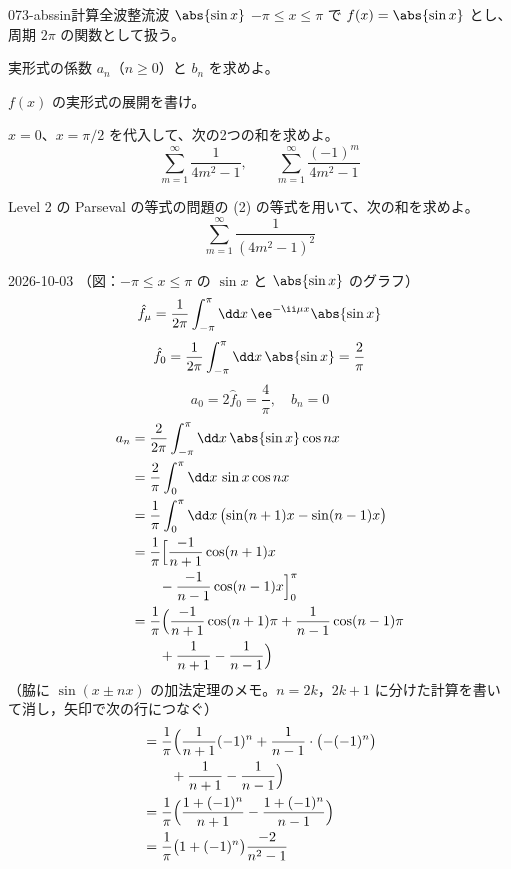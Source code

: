 \documentclass[uplatex,dvipdfmx,a4paper,11pt]{jsarticle}
\begin{document}
\begin{mondai}{073-abssin}{計算}{全波整流波 $\abs{\sin x}$}
$-\pi\le x\le\pi$ で $f(x)=\abs{\sin x}$ とし、周期 $2\pi$ の関数として扱う。
\begin{shoumon}
  \item 実形式の係数 $a_n$（$n\ge0$）と $b_n$ を求めよ。
  \item $f(x)$ の実形式の展開を書け。
  \item $x=0$、$x=\pi/2$ を代入して、次の2つの和を求めよ。
\[
\sum_{m=1}^{\infty}\frac{1}{4m^{2}-1},\qquad\sum_{m=1}^{\infty}\frac{(-1)^{m}}{4m^{2}-1}
\]
  \item Level 2 の Parseval の等式の問題の (2) の等式を用いて、次の和を求めよ。
\[
\sum_{m=1}^{\infty}\frac{1}{(4m^{2}-1)^{2}}
\]
\end{shoumon}
\begin{kotaeutsushi}{2026-10-03}
（図：$-\pi\le x\le\pi$ の $\sin x$ と $\abs{\sin x}$ のグラフ）
\[ \hat{f}_{\mu}=\frac{1}{2\pi}\int_{-\pi}^{\pi}\dd x\,\ee^{-\ii\mu x}\abs{\sin x} \]
\[ \hat{f}_0=\frac{1}{2\pi}\int_{-\pi}^{\pi}\dd x\,\abs{\sin x}=\frac{2}{\pi} \]
\[ a_0=2\hat{f}_0=\frac{4}{\pi},\quad b_n=0 \]
\begin{align*}
  a_n&=\frac{2}{2\pi}\int_{-\pi}^{\pi}\dd x\,\abs{\sin x}\cos nx\\
  &=\frac{2}{\pi}\int_{0}^{\pi}\dd x\,\sin x\cos nx\\
  &=\frac{1}{\pi}\int_{0}^{\pi}\dd x\,\bigl(\sin(n+1)x-\sin(n-1)x\bigr)\\
  &=\frac{1}{\pi}\Bigl[\frac{-1}{n+1}\cos(n+1)x\\
  &\qquad-\frac{-1}{n-1}\cos(n-1)x\Bigr]_{0}^{\pi}\\
  &=\frac{1}{\pi}\Bigl(\frac{-1}{n+1}\cos(n+1)\pi+\frac{1}{n-1}\cos(n-1)\pi\\
  &\qquad+\frac{1}{n+1}-\frac{1}{n-1}\Bigr)
\end{align*}
（脇に $\sin(x\pm nx)$ の加法定理のメモ。$n=2k$，$2k+1$ に分けた計算を書いて消し，矢印で次の行につなぐ）
\begin{align*}
  &=\frac{1}{\pi}\Bigl(\frac{1}{n+1}(-1)^{n}+\frac{1}{n-1}\cdot\bigl(-(-1)^{n}\bigr)\\
  &\qquad+\frac{1}{n+1}-\frac{1}{n-1}\Bigr)\\
  &=\frac{1}{\pi}\Bigl(\frac{1+(-1)^{n}}{n+1}-\frac{1+(-1)^{n}}{n-1}\Bigr)\\
  &=\frac{1}{\pi}\bigl(1+(-1)^{n}\bigr)\frac{-2}{n^{2}-1}\\

\end{align*}
\end{kotaeutsushi}
\end{mondai}
\end{document}
